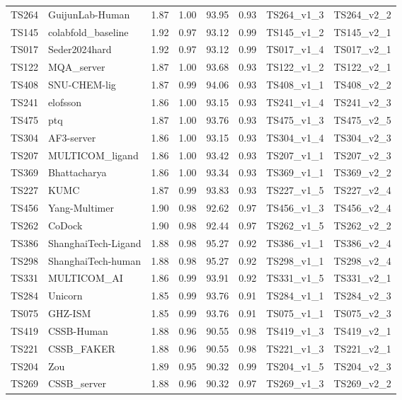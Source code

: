 \begin{longtable}{llllllll}
TS264 & GuijunLab-Human & 1.87 & 1.00 & 93.95 & 0.93 & TS264\_v1\_3 & TS264\_v2\_2 \\ 
TS145 & colabfold\_baseline & 1.92 & 0.97 & 93.12 & 0.99 & TS145\_v1\_2 & TS145\_v2\_1 \\ 
TS017 & Seder2024hard & 1.92 & 0.97 & 93.12 & 0.99 & TS017\_v1\_4 & TS017\_v2\_1 \\ 
TS122 & MQA\_server & 1.87 & 1.00 & 93.68 & 0.93 & TS122\_v1\_2 & TS122\_v2\_1 \\ 
TS408 & SNU-CHEM-lig & 1.87 & 0.99 & 94.06 & 0.93 & TS408\_v1\_1 & TS408\_v2\_2 \\ 
TS241 & elofsson & 1.86 & 1.00 & 93.15 & 0.93 & TS241\_v1\_4 & TS241\_v2\_3 \\ 
TS475 & ptq & 1.87 & 1.00 & 93.76 & 0.93 & TS475\_v1\_3 & TS475\_v2\_5 \\ 
TS304 & AF3-server & 1.86 & 1.00 & 93.15 & 0.93 & TS304\_v1\_4 & TS304\_v2\_3 \\ 
TS207 & MULTICOM\_ligand & 1.86 & 1.00 & 93.42 & 0.93 & TS207\_v1\_1 & TS207\_v2\_3 \\ 
TS369 & Bhattacharya & 1.86 & 1.00 & 93.34 & 0.93 & TS369\_v1\_1 & TS369\_v2\_2 \\ 
TS227 & KUMC & 1.87 & 0.99 & 93.83 & 0.93 & TS227\_v1\_5 & TS227\_v2\_4 \\ 
TS456 & Yang-Multimer & 1.90 & 0.98 & 92.62 & 0.97 & TS456\_v1\_3 & TS456\_v2\_4 \\ 
TS262 & CoDock & 1.90 & 0.98 & 92.44 & 0.97 & TS262\_v1\_5 & TS262\_v2\_2 \\ 
TS386 & ShanghaiTech-Ligand & 1.88 & 0.98 & 95.27 & 0.92 & TS386\_v1\_1 & TS386\_v2\_4 \\ 
TS298 & ShanghaiTech-human & 1.88 & 0.98 & 95.27 & 0.92 & TS298\_v1\_1 & TS298\_v2\_4 \\ 
TS331 & MULTICOM\_AI & 1.86 & 0.99 & 93.91 & 0.92 & TS331\_v1\_5 & TS331\_v2\_1 \\ 
TS284 & Unicorn & 1.85 & 0.99 & 93.76 & 0.91 & TS284\_v1\_1 & TS284\_v2\_3 \\ 
TS075 & GHZ-ISM & 1.85 & 0.99 & 93.76 & 0.91 & TS075\_v1\_1 & TS075\_v2\_3 \\ 
TS419 & CSSB-Human & 1.88 & 0.96 & 90.55 & 0.98 & TS419\_v1\_3 & TS419\_v2\_1 \\ 
TS221 & CSSB\_FAKER & 1.88 & 0.96 & 90.55 & 0.98 & TS221\_v1\_3 & TS221\_v2\_1 \\ 
TS204 & Zou & 1.89 & 0.95 & 90.32 & 0.99 & TS204\_v1\_5 & TS204\_v2\_3 \\ 
TS269 & CSSB\_server & 1.88 & 0.96 & 90.32 & 0.97 & TS269\_v1\_3 & TS269\_v2\_2 \\ 

\end{longtable}
